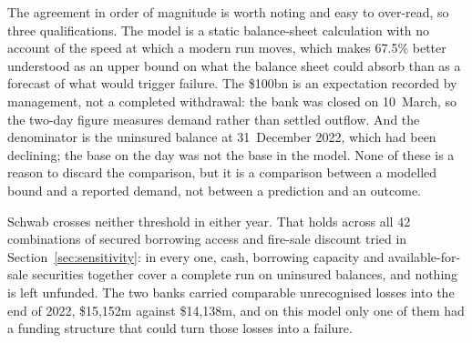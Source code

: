 The agreement in order of magnitude is worth noting and easy to over-read, so three
qualifications. The model is a static balance-sheet calculation with no account of the
speed at which a modern run moves, which makes 67.5\% better understood as an upper
bound on what the balance sheet could absorb than as a forecast of what would trigger
failure. The \$100bn is an expectation recorded by management, not a completed
withdrawal: the bank was closed on 10~March, so the two-day figure measures demand
rather than settled outflow. And the denominator is the uninsured balance at
31~December 2022, which had been declining; the base on the day was not the base in
the model. None of these is a reason to discard the comparison, but it is a comparison
between a modelled bound and a reported demand, not between a prediction and an
outcome.

Schwab crosses neither threshold in either year. That holds across all 42
combinations of secured borrowing access and fire-sale discount tried in
Section~\ref{sec:sensitivity}: in every one, cash, borrowing capacity and
available-for-sale securities together cover a complete run on uninsured balances,
and nothing is left unfunded. The two banks carried comparable unrecognised losses
into the end of 2022, \$15,152m against \$14,138m, and on this model only one of
them had a funding structure that could turn those losses into a failure.
